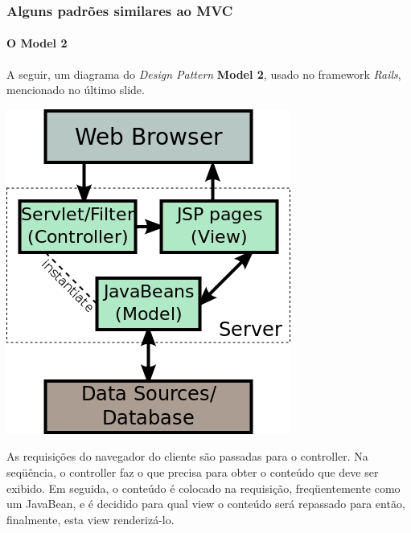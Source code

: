 \documentclass{beamer}
\begin{document}
\begin{frame}
\frametitle{Alguns padrões similares ao MVC}
\framesubtitle{O Model 2}
	A seguir, um diagrama do \textit{Design Pattern} \textbf{Model 2}, usado no framework \textit{Rails}, mencionado no último slide.
	\begin{center}
		\includegraphics[scale=0.175]{Model2.jpg}
	\end{center}
	As requisições do navegador do cliente são passadas para o controller. Na seqüência, o controller faz o que precisa para obter o conteúdo que deve ser exibido.
	Em seguida, o conteúdo é colocado na requisição, freqüentemente como um JavaBean, e é decidido para qual view o conteúdo será repassado para então, finalmente, esta
	view renderizá-lo.
\end{frame}
\end{document}

